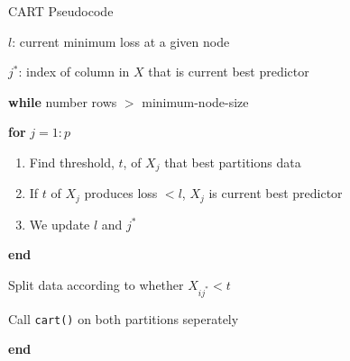 \documentclass[pdf]{beamer}
\begin{document}
				
		\begin{frame}{CART Pseudocode}
		\begin{enumerate}[]
			{\selectfont
						
			\item $l$: current minimum loss at a given node
			\item $j^*$: index of column in $X$ that is current best predictor  
			
			\vspace{5 mm}			
			
			\vspace{3 mm}

			\item{\textbf{while} number rows $>$ minimum-node-size}
				\item \hspace{3 mm} \textbf{for} $j = 1:p$
					\begin{enumerate}[  ]
						\item \hspace{6 mm} Find threshold, $t$, of $X_j$ that best partitions data
						\item \hspace{6 mm} If $t$ of $X_j$ produces loss $< l$, $X_j$ is current best predictor
						\item \hspace{6 mm} We update $l$ and $j^*$
					\end{enumerate}
				\item \hspace{3 mm} \textbf{end}
				\item \hspace{3 mm} Split data according to whether $X_{ij^*} < t$
				\item \hspace{3 mm} Call \texttt{cart()} on both partitions seperately
			\item \textbf{end}
			}
		\end{enumerate}
		\end{frame}
		
\end{document}
